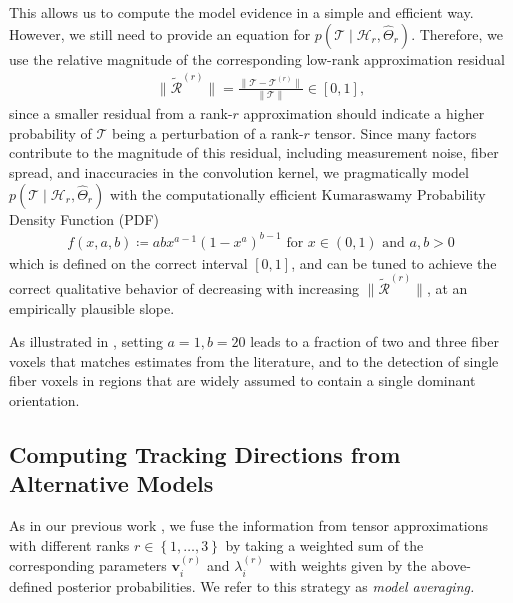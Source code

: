 This allows us to compute the model evidence in a simple and efficient way.
However, we still need to provide an equation for $p
\left( \mathcal{T} \mid \mathcal{H}_r , \hat{\Theta}_r \right)$. Therefore, we
use the relative magnitude of the corresponding low-rank approximation residual 
\begin{align}
	\| \tilde{\mathcal{R}}^{\left( r \right)} \| = \frac{ \| \mathcal{T} -
	\mathcal{T}^{\left( r \right)} \| }{ \| \mathcal{T} \|} \in \left[ 0,1
	\right],
	\label{eq:residual}
\end{align}
since a smaller residual from a rank-$r$ approximation should indicate a higher probability of $\mathcal{T}$ being a perturbation of a rank-$r$ tensor. Since many factors contribute to the magnitude of this residual, including measurement noise, fiber spread, and inaccuracies in the convolution kernel, we pragmatically model
$p
\left( \mathcal{T} \mid \mathcal{H}_r , \hat{\Theta}_r \right)$ with the computationally efficient Kumaraswamy Probability Density Function (PDF) \cite{Kumaraswamy1980}
\begin{align}
	f \left( x, a, b \right) \coloneqq ab x^{a-1} \left( 1- x^a
	\right)^{b-1} \text{ for } x \in \left( 0,1 \right) \text{ and } a,b >
	0
	\label{eq:Kumaraswamy}
\end{align}
which is defined on the correct interval $[0,1]$, and can be tuned to achieve the correct qualitative behavior of decreasing with increasing $\| \tilde{\mathcal{R}}^{\left( r \right)} \|$, at an empirically plausible slope.

As illustrated in \cite{Gruen:2021}, setting $a=1,b=20$ leads to a fraction of two and three fiber voxels that matches estimates from the literature, and to the detection of single fiber voxels in regions that are widely assumed to contain a single dominant orientation.

\subsection{Computing Tracking Directions from Alternative Models}
\label{sec:computing-tracking-directions}

As in our previous work \cite{Gruen:2021}, we fuse the information from tensor approximations with different ranks $r \in \left\{ 1,\dots , 3 \right\}$ by taking a weighted sum of the
corresponding parameters $\mathbf{v}_i^{\left( r \right)}$ and
$\lambda_i^{\left( r \right)}$ with weights given by the above-defined posterior probabilities. We refer to this strategy as \emph{model averaging.}

